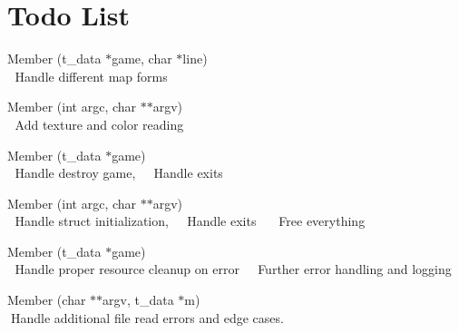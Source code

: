 \chapter{Todo List}
\hypertarget{todo}{}\label{todo}

\begin{DoxyRefList}
\item[Member \doxylink{read__map_8c_a804cd515bd4c1bf7169adeb352db80fb}{add\+\_\+line} (t\+\_\+data \texorpdfstring{$\ast$}{*}game, char \texorpdfstring{$\ast$}{*}line)]\hfill \\
\label{todo__todo000004}%
%
👾 Handle different map forms  
\item[Member \doxylink{parsing_8c_a9572228285cd82518fa287634356ac30}{check\+\_\+args} (int argc, char \texorpdfstring{$\ast$}{*}\texorpdfstring{$\ast$}{*}argv)]\hfill \\
\label{todo__todo000003}%
%
👾 Add texture and color reading


\item[Member \doxylink{cub3d_8c_a935bbae1ea2cb5d18534db1274ec24dd}{exit\+\_\+point} (t\+\_\+data \texorpdfstring{$\ast$}{*}game)]\hfill \\
\label{todo__todo000001}%
%
👾 Handle destroy game,~\newline
 👾 Handle exits  
\item[Member \doxylink{cub3d_8c_a3c04138a5bfe5d72780bb7e82a18e627}{main} (int argc, char \texorpdfstring{$\ast$}{*}\texorpdfstring{$\ast$}{*}argv)]\hfill \\
\label{todo__todo000002}%
%
👾 Handle struct initialization,~\newline
 👾 Handle exits ~\newline
 👾 Free everything  
\item[Member \doxylink{mlx__init__create__win_8c_a81e5bd795cb879b651de99812ac575da}{mlx\+\_\+init\+\_\+create\+\_\+window} (t\+\_\+data \texorpdfstring{$\ast$}{*}game)]\hfill \\
\label{todo__todo000006}%
%
👾 Handle proper resource cleanup on error~\newline
 👾 Further error handling and logging  
\item[Member \doxylink{read__map_8c_abc6a0e39f4097410a6462b03e8b98fe5}{read\+\_\+map} (char \texorpdfstring{$\ast$}{*}\texorpdfstring{$\ast$}{*}argv, t\+\_\+data \texorpdfstring{$\ast$}{*}m)]\hfill \\
\label{todo__todo000005}%
%
👾\+Handle additional file read errors and edge cases. 
\end{DoxyRefList}
